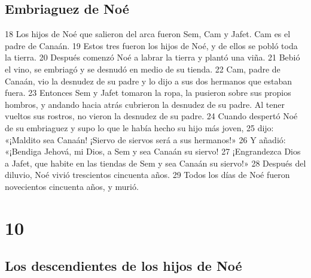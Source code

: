 \section*{Embriaguez de Noé}

18 Los hijos de Noé que salieron del arca fueron Sem, Cam y Jafet. Cam es el padre de Canaán. 19 Estos tres fueron los hijos de Noé, y de ellos se pobló toda la tierra.
20 Después comenzó Noé a labrar la tierra y plantó una viña.
21 Bebió el vino, se embriagó y se desnudó en medio de su tienda.
22 Cam, padre de Canaán, vio la desnudez de su padre y lo dijo a sus dos hermanos que estaban fuera.
23 Entonces Sem y Jafet tomaron la ropa, la pusieron sobre sus propios hombros, y andando hacia atrás cubrieron la desnudez de su padre. Al tener vueltos sus rostros, no vieron la desnudez de su padre.
24 Cuando despertó Noé de su embriaguez y supo lo que le había hecho su hijo más joven,
25 dijo:
«¡Maldito sea Canaán!
¡Siervo de siervos será a sus hermanos!»
26 Y añadió:
«¡Bendiga Jehová, mi Dios, a Sem
y sea Canaán su siervo!
27 ¡Engrandezca Dios a Jafet,
que habite en las tiendas de Sem
y sea Canaán su siervo!»
28 Después del diluvio, Noé vivió trescientos cincuenta años. 29 Todos los días de Noé fueron novecientos cincuenta años, y murió.

\chapter{10}

\section*{Los descendientes de los hijos de Noé}

